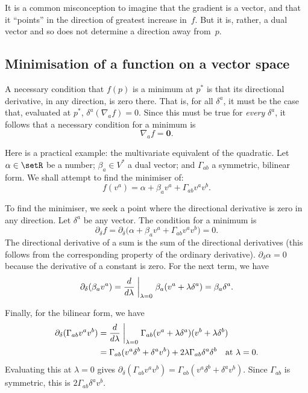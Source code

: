\documentclass[10pt, a4paper]{article}
\newcommand{\bzero}{\mathbold{0}} %
\begin{document}
It is a common misconception to imagine that the gradient is a vector,
and that it ``points'' in the direction of greatest increase
in~$f$. But it is, rather, a dual vector and so does not determine a
direction away from~$p$.

\subsection{Minimisation of a function on a vector space}

A necessary condition that $f(p)$ is a minimum at $p^*$ is that its
directional derivative, in any direction, is zero there. That is, for
all $\delta^a$, it must be the case that, evaluated at $p^*$,
$\delta^a(\nabla_a f)=0$. Since this must be true for \emph{every}
$\delta^a$, it follows that a necessary condition for a minimum is
\begin{equation*}
  \nabla_a f = \bzero.
\end{equation*}

Here is a practical example: the multivariate equivalent of the
quadratic. Let $\alpha\in\setR$ be a number; $\beta_a\in V^*$ a dual vector; and
$\Gamma_{ab}$ a symmetric, bilinear form. We shall attempt to find the minimiser of:
\begin{equation}
  f(v^a) = \alpha + \beta_a v^a + \Gamma_{ab}v^av^b.
\label{eq:quadratic-form}
\end{equation}

To find the minimiser, we seek a point where the directional
derivative is zero in any direction. Let $\delta^a$ be any vector. The
condition for a minimum is
\begin{equation*}
  \partial_\delta f = \partial_\delta\bigl(\alpha + \beta_a v^a + \Gamma_{ab}v^av^b\bigr) = 0.
\end{equation*}
The directional derivative of a sum is the sum of the directional
derivatives (this follows from the corresponding property of the
ordinary derivative). $\partial_\delta \alpha = 0$ because the derivative of a constant
is zero. For the next term, we have
\begin{equation*}
  \partial_\delta (\beta_av^a) = \frac{d}{d\lambda}\biggm|_{\lambda=0}\beta_a(v^a + \lambda \delta^a) = \beta_a\delta^a.
\end{equation*}

Finally, for the bilinear form, we have
\begin{align*}
  \partial_\delta (\Gamma_{ab}v^av^b) &= \frac{d}{d\lambda}\biggm|_{\lambda=0} \Gamma_{ab}(v^a+\lambda\delta^a)(v^b+\lambda\delta^b) \\
  &= \Gamma_{ab}(v^a\delta^b + \delta^av^b) + 2\lambda \Gamma_{ab}\delta^a\delta^b \quad\text{at $\lambda=0$}.
\end{align*}
Evaluating this at $\lambda=0$ gives $\partial_\delta
(\Gamma_{ab}v^av^b)=\Gamma_{ab}(v^a\delta^b+\delta^av^b)$. Since $\Gamma_{ab}$ is symmetric,
this is $2\Gamma_{ab}\delta^av^b$.
\end{document}
